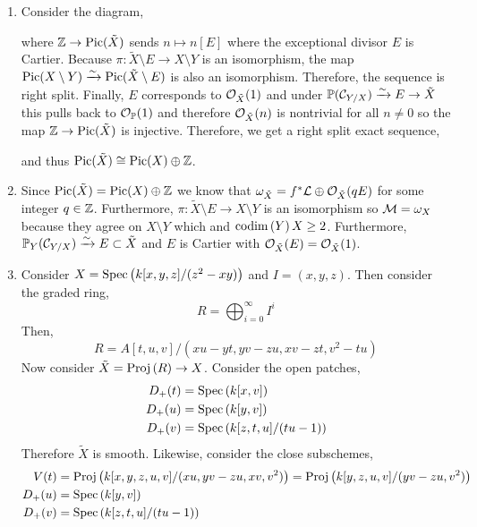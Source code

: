 \documentclass[12pt]{article}
\begin{document}
\begin{enumerate}
\item Consider the diagram,
\begin{center}
\end{center}
where $\mathbb{Z} \to \mathrm{Pic}(\tilde{X})$ sends $n \mapsto n [E]$ where the exceptional divisor $E$ is Cartier. 
Because $\pi : \tilde{X} \setminus E \to X \setminus Y$ is an isomorphism, the map $\mathrm{Pic}(X \setminus Y) \xrightarrow{\sim} \mathrm{Pic}(\tilde{X} \setminus E)$ is also an isomorphism. Therefore, the sequence is right split. Finally, $E$ corresponds to $\mathcal{O}_{\tilde{X}}(1)$ and under $\mathbb{P}(\mathcal{C}_{Y/X}) \xrightarrow{\sim} E \to \tilde{X}$ this pulls back to $\mathcal{O}_{\mathbb{P}}(1)$ and therefore $\mathcal{O}_{\tilde{X}}(n)$ is nontrivial for all $n \neq 0$ so the map $\mathbb{Z} \to \mathrm{Pic}(\tilde{X})$ is injective. Therefore, we get a right split exact sequence,
\begin{center}
\end{center}
and thus $\mathrm{Pic}(\tilde{X}) \cong \mathrm{Pic}(X) \oplus \mathbb{Z}$.

\item Since $\mathrm{Pic}(\tilde{X}) = \mathrm{Pic}(X) \oplus \mathbb{Z}$ we know that $\omega_{\tilde{X}} = f^* \mathcal{L} \oplus \mathcal{O}_{\tilde{X}}(q E)$ for some integer $q \in \mathbb{Z}$. Furthermore, $\pi : \tilde{X} \setminus E \to X \setminus Y$ is an isomorphism so $\mathcal{M} = \omega_X$ because they agree on $X \setminus Y$ which and $\mathrm{codim}\left( Y \right){X} \ge 2$. Furthermore, $\mathbb{P}_Y(\mathcal{C}_{Y/X}) \xrightarrow{\sim} E \subset \tilde{X}$ and $E$ is Cartier with $\mathcal{O}_{\tilde{X}}(E) = \mathcal{O}_{\tilde{X}}(1)$.

\item Consider $X = \mathrm{Spec}\left( k[x,y,z]/(z^2 - xy) \right)$ and $I = (x,y,z)$. Then consider the graded ring,
\[ R = \bigoplus_{i = 0}^\infty I^i \]
Then,
\[ R = A[t, u, v]/(x u - y t, y v - z u, x v - z t, v^2 - tu) \]
Now consider $\tilde{X} = \mathrm{Proj}\left( R \right) \to X$. Consider the open patches,
\begin{align*}
D_+(t) & = \mathrm{Spec}\left( k[x, v] \right) 
\\
D_+(u) & = \mathrm{Spec}\left( k[y, v] \right) 
\\
D_+(v) & = \mathrm{Spec}\left( k[z, t, u]/(tu - 1) \right)
\end{align*}
Therefore $\tilde{X}$ is smooth. Likewise, consider the close subschemes,
\begin{align*}
V(t) & = \mathrm{Proj}\left( k[x, y, z, u, v]/(xu, yv - zu, xv, v^2) \right) = \mathrm{Proj}\left( k[y, z, u, v]/(yv - zu, v^2) \right)
\\
D_+(u) & = \mathrm{Spec}\left( k[y, v] \right) 
\\
D_+(v) & = \mathrm{Spec}\left( k[z, t, u]/(tu - 1) \right)
\end{align*}
\end{enumerate}
\end{document}
